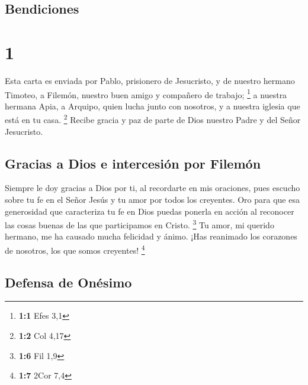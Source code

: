 \hypertarget{bendiciones}{%
\subsection{Bendiciones}\label{bendiciones}}

\hypertarget{section}{%
\section{1}\label{section}}

 Esta carta es enviada por Pablo, prisionero de
Jesucristo, y de nuestro hermano Timoteo, a Filemón, nuestro buen amigo
y compañero de trabajo; \footnote{\textbf{1:1} Efes 3,1} 
a nuestra hermana Apia, a Arquipo, quien lucha junto con nosotros, y a
nuestra iglesia que está en tu casa. \footnote{\textbf{1:2} Col 4,17}
 Recibe gracia y paz de parte de Dios nuestro Padre y del
Señor Jesucristo.

\hypertarget{gracias-a-dios-e-intercesiuxf3n-por-filemuxf3n}{%
\subsection{Gracias a Dios e intercesión por
Filemón}\label{gracias-a-dios-e-intercesiuxf3n-por-filemuxf3n}}

 Siempre le doy gracias a Dios por ti, al recordarte en
mis oraciones,  pues escucho sobre tu fe en el Señor Jesús
y tu amor por todos los creyentes.  Oro para que esa
generosidad que caracteriza tu fe en Dios puedas ponerla en acción al
reconocer las cosas buenas de las que participamos en Cristo.
\footnote{\textbf{1:6} Fil 1,9}  Tu amor, mi querido
hermano, me ha causado mucha felicidad y ánimo. ¡Has reanimado los
corazones de nosotros, los que somos creyentes! \footnote{\textbf{1:7}
  2Cor 7,4}

\hypertarget{defensa-de-onuxe9simo}{%
\subsection{Defensa de Onésimo}\label{defensa-de-onuxe9simo}}

